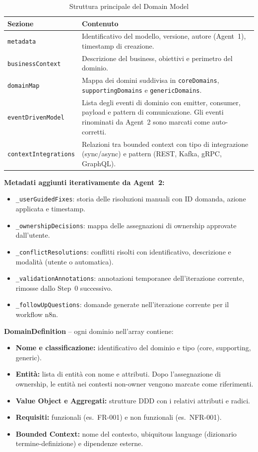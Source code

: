 \documentclass[12pt,a4paper]{report}
\begin{document}
\begin{table}[H]
\centering
\renewcommand{\arraystretch}{1.3}
\begin{tabular}{lp{10cm}}
\toprule
\textbf{Sezione} & \textbf{Contenuto} \\
\midrule
\texttt{metadata}             & Identificativo del modello, versione, autore (Agent~1), timestamp di creazione. \\
\texttt{businessContext}      & Descrizione del business, obiettivi e perimetro del dominio. \\
\texttt{domainMap}            & Mappa dei domini suddivisa in \texttt{coreDomains}, \texttt{supportingDomains} e \texttt{genericDomains}. \\
\texttt{eventDrivenModel}     & Lista degli eventi di dominio con emitter, consumer, payload e pattern di comunicazione. Gli eventi rinominati da Agent~2 sono marcati come auto-corretti. \\
\texttt{contextIntegrations}  & Relazioni tra bounded context con tipo di integrazione (sync/async) e pattern (REST, Kafka, gRPC, GraphQL). \\
\bottomrule
\end{tabular}
\caption{Struttura principale del Domain Model}
\label{tab:domain-model-schema}
\end{table}

\textbf{Metadati aggiunti iterativamente da Agent~2:}
\begin{itemize}
  \item \texttt{\_userGuidedFixes}: storia delle risoluzioni manuali con ID domanda, azione applicata e timestamp.
  \item \texttt{\_ownershipDecisions}: mappa delle assegnazioni di ownership approvate dall'utente.
  \item \texttt{\_conflictResolutions}: conflitti risolti con identificativo, descrizione e modalità (utente o automatica).
  \item \texttt{\_validationAnnotations}: annotazioni temporanee dell'iterazione corrente, rimosse dallo Step~0 successivo.
  \item \texttt{\_followUpQuestions}: domande generate nell'iterazione corrente per il workflow n8n.
\end{itemize}

\textbf{DomainDefinition} -- ogni dominio nell'array contiene:
\begin{itemize}
  \item \textbf{Nome e classificazione:} identificativo del dominio e tipo (core, supporting, generic).
  \item \textbf{Entità:} lista di entità con nome e attributi. Dopo l'assegnazione di ownership, le entità nei contesti non-owner vengono marcate come riferimenti.
  \item \textbf{Value Object e Aggregati:} strutture DDD con i relativi attributi e radici.
  \item \textbf{Requisiti:} funzionali (es.\ FR-001) e non funzionali (es.\ NFR-001).
  \item \textbf{Bounded Context:} nome del contesto, ubiquitous language (dizionario termine-definizione) e dipendenze esterne.
\end{itemize}
\end{document}
